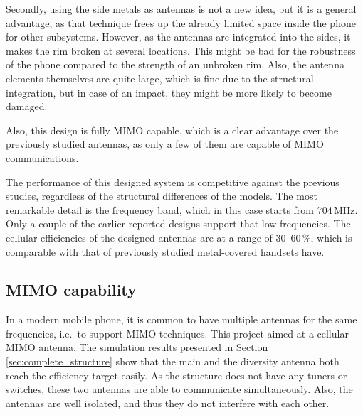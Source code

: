 Secondly, using the side metals as antennas is not a new idea, but it is a general advantage, as that technique frees up the already limited space inside the phone for other subsystems. However, as the antennas are integrated into the sides, it makes the rim broken at several locations. This might be bad for the robustness of the phone compared to the strength of an unbroken rim. Also, the antenna elements themselves are quite large, which is fine due to the structural integration, but in case of an impact, they might be more likely to become damaged.

Also, this design is fully MIMO capable, which is a clear advantage over the previously studied antennas, as only a few of them are capable of MIMO communications. 

The performance of this designed system is competitive against the previous studies, regardless of the structural differences of the models. The most remarkable detail is the frequency band, which in this case starts from 704\,MHz. Only a couple of the earlier reported designs support that low frequencies. The cellular efficiencies of the designed antennas are at a range of $30$--$60\,\%$, which is comparable with that of previously studied metal-covered handsets have.


\subsection{MIMO capability}
\label{sec:mimo_cap}
In a modern mobile phone, it is common to have multiple antennas for the same frequencies, i.e.\ to support MIMO techniques. This project aimed at a cellular MIMO antenna. The simulation results presented in Section \ref{sec:complete_structure} show that the main and the diversity antenna both reach the efficiency target easily. As the structure does not have any tuners or switches, these two antennas are able to communicate simultaneously. Also, the antennas are well isolated, and thus they do not interfere with each other.


